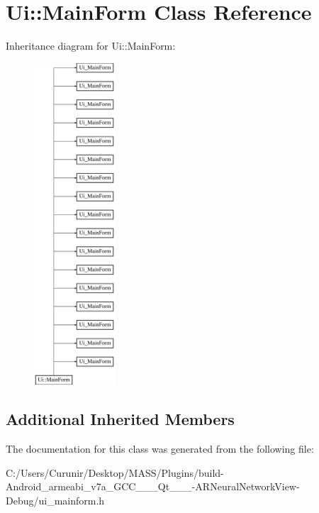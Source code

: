 \hypertarget{class_ui_1_1_main_form}{}\section{Ui\+:\+:Main\+Form Class Reference}
\label{class_ui_1_1_main_form}
Inheritance diagram for Ui\+:\+:Main\+Form\+:\begin{figure}[H]
\begin{center}
\leavevmode
\includegraphics[height=12.000000cm]{class_ui_1_1_main_form}
\end{center}
\end{figure}
\subsection*{Additional Inherited Members}


The documentation for this class was generated from the following file\+:\begin{DoxyCompactItemize}
\item 
C\+:/\+Users/\+Curunir/\+Desktop/\+M\+A\+S\+S/\+Plugins/build-\/\+Android\+\_\+armeabi\+\_\+v7a\+\_\+\+G\+C\+C\+\_\+\_\+\_\+\+Qt\+\_\+\_\+\_-\/\+A\+R\+Neural\+Network\+View-\/\+Debug/ui\+\_\+mainform.\+h\end{DoxyCompactItemize}
